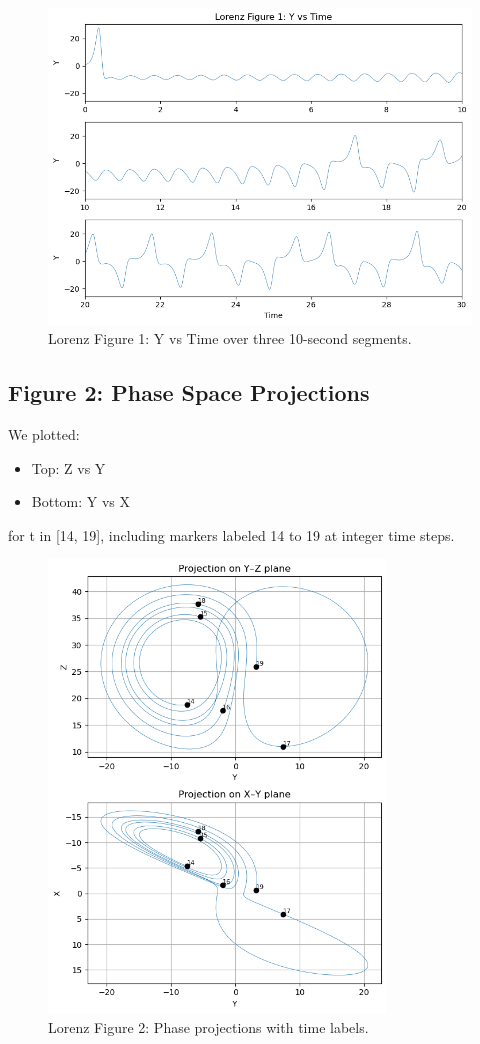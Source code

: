 \documentclass[12pt]{article}
\begin{document}
\begin{figure}[H]
    \centering
    \includegraphics[width=1 \textwidth]{download (3).png}
    \caption{Lorenz Figure 1: Y vs Time over three 10-second segments.}
\end{figure}

\subsection*{Figure 2: Phase Space Projections}
We plotted:
\begin{itemize}
    \item Top: Z vs Y
    \item Bottom: Y vs X
\end{itemize}
for t in [14, 19], including markers labeled 14 to 19 at integer time steps.

\begin{figure}[H]
    \centering
    \includegraphics[width=0.8\textwidth]{download (4).png}
    \caption{Lorenz Figure 2: Phase projections with time labels.}
\end{figure}
\end{document}
